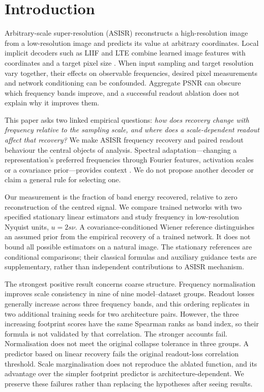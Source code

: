 \section{Introduction}\label{sec:intro}
Arbitrary-scale super-resolution (ASISR) reconstructs a high-resolution image from a low-resolution image and predicts its value at arbitrary coordinates. Local implicit decoders such as LIIF and LTE combine learned image features with coordinates and a target pixel size \citep{chen2021liif,lee2022lte}. When input sampling and target resolution vary together, their effects on observable frequencies, desired pixel measurements and network conditioning can be confounded. Aggregate PSNR can obscure which frequency bands improve, and a successful readout ablation does not explain why it improves them.

This paper asks two linked empirical questions: \emph{how does recovery change with frequency relative to the sampling scale, and where does a scale-dependent readout affect that recovery?} We make ASISR frequency recovery and paired readout behaviour the central objects of analysis. Spectral adaptation---changing a representation's preferred frequencies through Fourier features, activation scales or a covariance prior---provides context \citep{tancik2020fourier,sitzmann2020siren,kania2025fresh}. We do not propose another decoder or claim a general rule for selecting one.

Our measurement is the fraction of band energy recovered, relative to zero reconstruction of the centred signal. We compare trained networks with two specified stationary linear estimators and study frequency in low-resolution Nyquist units, $u=2s\nu$. A covariance-conditioned Wiener reference distinguishes an assumed prior from the empirical recovery of a trained network. It does not bound all possible estimators on a natural image. The stationary references are conditional comparisons; their classical formulas and auxiliary guidance tests are supplementary, rather than independent contributions to ASISR mechanism.

The strongest positive result concerns coarse structure. Frequency normalisation improves scale consistency in nine of nine model--dataset groups. Readout losses generally increase across three frequency bands, and this ordering replicates in two additional training seeds for two architecture pairs. However, the three increasing footprint scores have the same Spearman ranks as band index, so their formula is not validated by that correlation. The stronger accounts fail. Normalisation does not meet the original collapse tolerance in three groups. A predictor based on linear recovery fails the original readout-loss correlation threshold. Scale marginalisation does not reproduce the ablated function, and its advantage over the simpler footprint predictor is architecture-dependent. We preserve these failures rather than replacing the hypotheses after seeing results.

